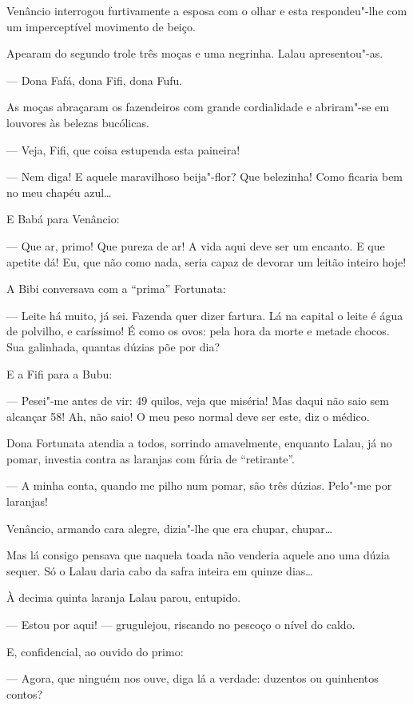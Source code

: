Venâncio interrogou furtivamente a esposa com o olhar e esta
respondeu"-lhe com um imperceptível movimento de beiço.

Apearam do segundo trole três moças e uma negrinha. Lalau apresentou"-as.

--- Dona Fafá, dona Fifi, dona Fufu.

As moças abraçaram os fazendeiros com grande cordialidade e abriram"-se
em louvores às belezas bucólicas.

--- Veja, Fifi, que coisa estupenda esta paineira!

--- Nem diga! E aquele maravilhoso beija"-flor? Que belezinha! Como
ficaria bem no meu chapéu azul\ldots{}

E Babá para Venâncio:

--- Que ar, primo! Que pureza de ar! A vida aqui deve ser um encanto. E
que apetite dá! Eu, que não como nada, seria capaz de devorar um leitão
inteiro hoje!

A Bibi conversava com a ``prima'' Fortunata:

--- Leite há muito, já sei. Fazenda quer dizer fartura. Lá na capital o
leite é água de polvilho, e caríssimo! É como os ovos: pela hora da
morte e metade chocos. Sua galinhada, quantas dúzias põe por dia?

E a Fifi para a Bubu:

--- Pesei"-me antes de vir: 49 quilos, veja que miséria! Mas daqui não
saio sem alcançar 58! Ah, não saio! O meu peso normal deve ser este, diz
o médico.

Dona Fortunata atendia a todos, sorrindo amavelmente, enquanto Lalau, já
no pomar, investia contra as laranjas com fúria de ``retirante''.

--- A minha conta, quando me pilho num pomar, são três dúzias. Pelo"-me
por laranjas!

Venâncio, armando cara alegre, dizia"-lhe que era chupar, chupar\ldots{}

Mas lá consigo pensava que naquela toada não venderia aquele ano uma
dúzia sequer. Só o Lalau daria cabo da safra inteira em quinze dias\ldots{}

À decima quinta laranja Lalau parou, entupido.

--- Estou por aqui! --- grugulejou, riscando no pescoço o nível do
caldo.

E, confidencial, ao ouvido do primo:

--- Agora, que ninguém nos ouve, diga lá a verdade: duzentos ou
quinhentos contos?

